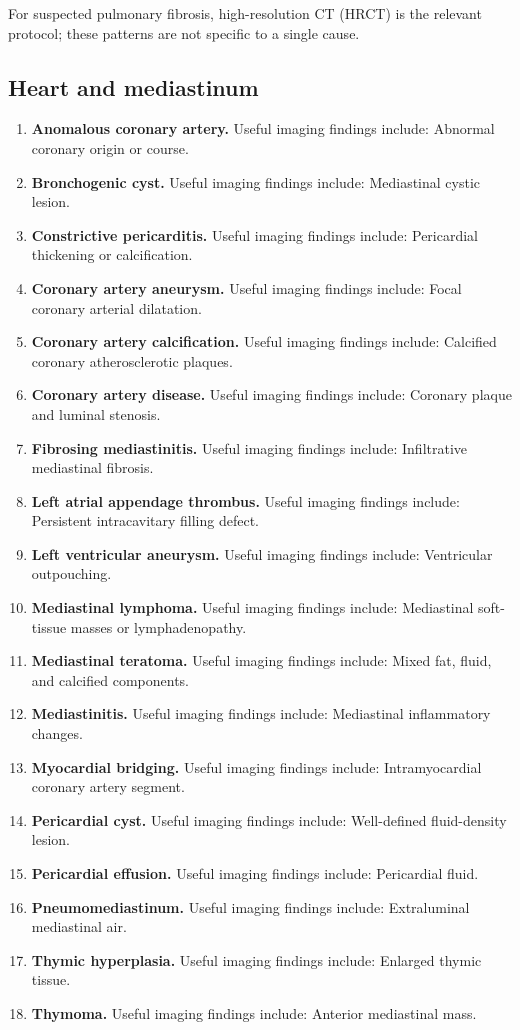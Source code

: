 For suspected pulmonary fibrosis, high-resolution CT (HRCT) is the relevant protocol; these patterns are not specific to a single cause.

\subsection{Heart and mediastinum}
\begin{enumerate}[leftmargin=*,itemsep=0.45em,topsep=0.4em]
\item \textbf{Anomalous coronary artery.} Useful imaging findings include: Abnormal coronary origin or course.
\item \textbf{Bronchogenic cyst.} Useful imaging findings include: Mediastinal cystic lesion.
\item \textbf{Constrictive pericarditis.} Useful imaging findings include: Pericardial thickening or calcification.
\item \textbf{Coronary artery aneurysm.} Useful imaging findings include: Focal coronary arterial dilatation.
\item \textbf{Coronary artery calcification.} Useful imaging findings include: Calcified coronary atherosclerotic plaques.
\item \textbf{Coronary artery disease.} Useful imaging findings include: Coronary plaque and luminal stenosis.
\item \textbf{Fibrosing mediastinitis.} Useful imaging findings include: Infiltrative mediastinal fibrosis.
\item \textbf{Left atrial appendage thrombus.} Useful imaging findings include: Persistent intracavitary filling defect.
\item \textbf{Left ventricular aneurysm.} Useful imaging findings include: Ventricular outpouching.
\item \textbf{Mediastinal lymphoma.} Useful imaging findings include: Mediastinal soft-tissue masses or lymphadenopathy.
\item \textbf{Mediastinal teratoma.} Useful imaging findings include: Mixed fat, fluid, and calcified components.
\item \textbf{Mediastinitis.} Useful imaging findings include: Mediastinal inflammatory changes.
\item \textbf{Myocardial bridging.} Useful imaging findings include: Intramyocardial coronary artery segment.
\item \textbf{Pericardial cyst.} Useful imaging findings include: Well-defined fluid-density lesion.
\item \textbf{Pericardial effusion.} Useful imaging findings include: Pericardial fluid.
\item \textbf{Pneumomediastinum.} Useful imaging findings include: Extraluminal mediastinal air.
\item \textbf{Thymic hyperplasia.} Useful imaging findings include: Enlarged thymic tissue.
\item \textbf{Thymoma.} Useful imaging findings include: Anterior mediastinal mass.
\end{enumerate}

